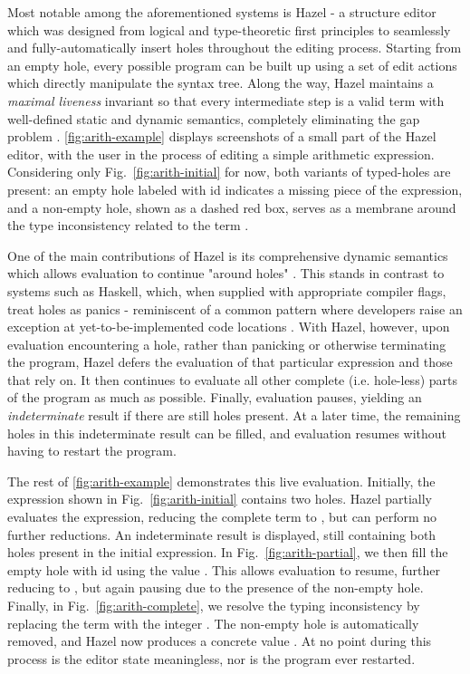 Most notable among the aforementioned systems is Hazel - a structure editor which was designed from logical and type-theoretic first principles to seamlessly and fully-automatically insert holes throughout the editing process. Starting from an empty hole, every possible program can be built up using a set of edit actions which directly manipulate the syntax tree. Along the way, Hazel maintains a \emph{maximal liveness} invariant so that every intermediate step is a valid term with well-defined static and dynamic semantics, completely eliminating the gap problem \cite{DBLP:journals/pacmpl/OmarVCH19}. \autoref{fig:arith-example} displays screenshots of a small part of the Hazel editor, with the user in the process of editing a simple arithmetic expression. Considering only Fig.~\ref{fig:arith-initial} for now, both variants of typed-holes are present: an empty hole labeled with id  indicates a missing piece of the expression, and a non-empty hole, shown as a dashed red box, serves as a membrane around the type inconsistency related to the term .

One of the main contributions of Hazel is its comprehensive dynamic semantics which allows evaluation to continue "around holes" \cite{DBLP:journals/pacmpl/OmarVCH19}. This stands in contrast to systems such as Haskell, which, when supplied with appropriate compiler flags, treat holes as panics - reminiscent of a common pattern where developers raise an exception at yet-to-be-implemented code locations \cite{GHCHoles}. With Hazel, however, upon evaluation encountering a hole, rather than panicking or otherwise terminating the program, Hazel defers the evaluation of that particular expression and those that rely on. It then continues to evaluate all other complete (i.e. hole-less) parts of the program as much as possible. Finally, evaluation pauses, yielding an \emph{indeterminate} result if there are still holes present. At a later time, the remaining holes in this indeterminate result can be filled, and evaluation resumes without having to restart the program. 

The rest of \autoref{fig:arith-example} demonstrates this live evaluation. Initially, the expression shown in Fig.~\ref{fig:arith-initial} contains two holes. Hazel partially evaluates the expression, reducing the complete term  to , but can perform no further reductions. An indeterminate result is displayed, still containing both holes present in the initial expression. In Fig.~\ref{fig:arith-partial}, we then fill the empty hole with id  using the value . This allows evaluation to resume, further reducing  to , but again pausing due to the presence of the non-empty hole. Finally, in Fig.~\ref{fig:arith-complete}, we resolve the typing inconsistency by replacing the term  with the integer . The non-empty hole is automatically removed, and Hazel now produces a concrete value . At no point during this process is the editor state meaningless, nor is the program ever restarted.

